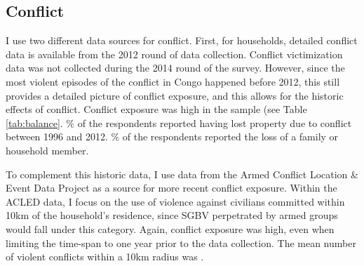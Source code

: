 \documentclass[10pt,a4paper,abstract=on]{scrartcl} %
\begin{document}
\subsection*{Conflict}
I use two different data sources for conflict. First, for  households, detailed conflict data is available from the 2012 round of data collection. Conflict victimization data was not collected during the 2014 round of the survey. However, since the most violent episodes of the conflict in Congo happened before 2012, this still provides a detailed picture of conflict exposure, and this allows for the historic effects of conflict. Conflict exposure was high in the sample (see Table \ref{tab:balance}. \% of the respondents reported having lost property due to conflict between 1996 and 2012.  \% of the respondents reported the loss of a family or household member.

To complement this historic data, I use data from the Armed Conflict Location \& Event Data Project \citep[ACLED;][]{Raleigh2010} as a source for more recent conflict exposure. Within the ACLED data, I focus on the use of violence against civilians committed within 10km of the household's residence, since SGBV perpetrated by armed groups would fall under this category. Again, conflict exposure was high, even when limiting the time-span to one year prior to the data collection. The mean number of violent conflicts within a 10km radius was . 
\end{document}
